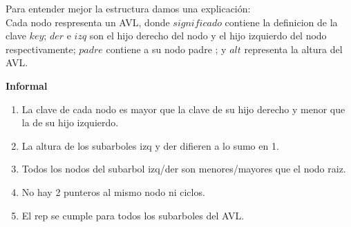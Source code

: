 






\disPautasDeImplementacion

\disEstructuraDeRepresentacion


\disJustificacionDeLaEstructuraElegida
{Para entender mejor la estructura damos una explicaci\'on: \\
Cada nodo respresenta un AVL, donde $significado$ contiene la definicion de la clave $key$; $der$ e $izq$ son el hijo derecho del nodo y el hijo izquierdo del nodo respectivamente; $padre$ contiene a su nodo padre ; y $alt$ representa la altura del AVL.} 

\disInvarianteDeRepresentacion
\hspace*{\disSubSubSecMargen}\textbf{\textsf{Informal}}

\hspace*{\disSubSubSecMargen}
\begin{enumerate}
\setlength{\itemindent}{3em}
  \item La clave de cada nodo es mayor que la clave de su hijo derecho y menor que la de su hijo izquierdo.
  \item La altura de los subarboles izq y der difieren a lo sumo en 1.
  \item Todos los nodos del subarbol izq/der son menores/mayores que el nodo raiz.
  \item No hay 2 punteros al mismo nodo ni ciclos.
  \item El rep se cumple para todos los subarboles del AVL.
\end{enumerate}

